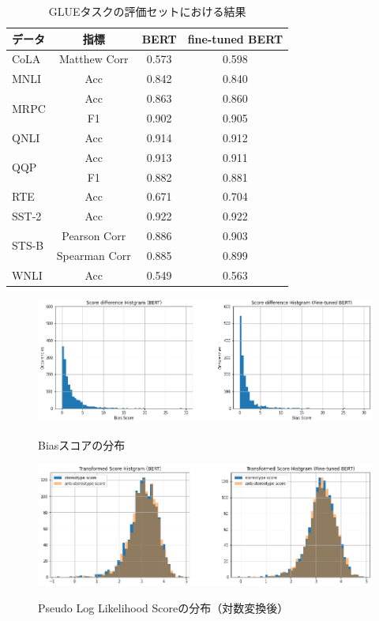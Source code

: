 \documentclass[
  platex, dvipdfmx %
]{nlp2021}
\begin{document}
\begin{table}[h]
\centering
\label{tab:results_glue}
\begin{tabular}{lccc}
\hline
データ & 指標 &  BERT & fine-tuned BERT \\
\hline
CoLA & Matthew Corr & 0.573 &  0.598 \\
\hline
MNLI & Acc & 0.842 &  0.840  \\
\hline
\multirow{2}{*}{MRPC} & Acc & 0.863 &  0.860  \\
 & F1 & 0.902 & 0.905 \\
\hline
QNLI & Acc & 0.914 & 0.912 \\
\hline
\multirow{2}{*}{QQP} & Acc & 0.913 & 0.911 \\
 & F1 & 0.882 & 0.881 \\
\hline
RTE & Acc & 0.671 & 0.704 \\
\hline
SST-2 & Acc & 0.922 & 0.922 \\
\hline
\multirow{2}{*}{STS-B} & Pearson Corr & 0.886 & 0.903\\
 & Spearman Corr & 0.885 & 0.899\\
\hline
WNLI & Acc & 0.549 & 0.563 \\
\hline
\end{tabular}
\caption{GLUEタスクの評価セットにおける結果}
\end{table}

\begin{figure}[h]
\centering
\includegraphics[width=15cm]{hist_score_diffrerence.png}
\label{fig:hist_bias}
\caption{Biasスコアの分布}
\end{figure}

\begin{figure}[h]
\centering
\includegraphics[width=15cm]{hist_transformed_pseudo_log_likelihood.png}
\label{fig:hist_transformed_log_likelihoods}
\caption{Pseudo Log Likelihood Scoreの分布（対数変換後）}
\end{figure}
\end{document}
